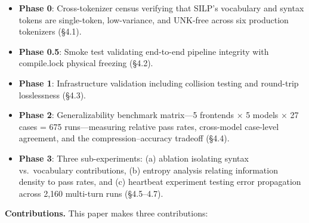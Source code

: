 \begin{itemize}

\tightlist

\item

  \textbf{Phase 0}: Cross-tokenizer census verifying that SILP's vocabulary and syntax tokens are single-token, low-variance, and UNK-free across six production tokenizers (§4.1).

\item

  \textbf{Phase 0.5}: Smoke test validating end-to-end pipeline integrity with compile.lock physical freezing (§4.2).

\item

  \textbf{Phase 1}: Infrastructure validation including collision testing and round-trip losslessness (§4.3).

\item

  \textbf{Phase 2}: Generalizability benchmark matrix---5 frontends × 5 models × 27 cases = 675 runs---measuring relative pass rates, cross-model case-level agreement, and the compression--accuracy tradeoff (§4.4).

\item

  \textbf{Phase 3}: Three sub-experiments: (a) ablation isolating syntax vs.~vocabulary contributions, (b) entropy analysis relating information density to pass rates, and (c) heartbeat experiment testing error propagation across 2,160 multi-turn runs (§4.5--4.7).

\end{itemize}



\textbf{Contributions.} This paper makes three contributions:



